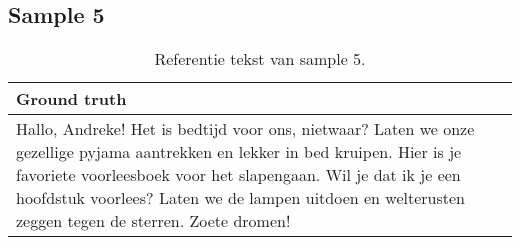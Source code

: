\subsection{Sample 5}
\begin{table}[htbp]
    \centering
    \label{tab:groundtruth_sample5}
    \begin{tabularx}{\textwidth}{|X|}
        \hline
        \textbf{Ground truth} \\
        \hline
        Hallo, Andreke! Het is bedtijd voor ons, nietwaar? Laten we onze gezellige pyjama aantrekken en lekker in bed kruipen. Hier is je favoriete voorleesboek voor het slapengaan. Wil je dat ik je een hoofdstuk voorlees? Laten we de lampen uitdoen en welterusten zeggen tegen de sterren. Zoete dromen! \\
        \hline
    \end{tabularx}
        \caption{Referentie tekst van sample 5.}
\end{table}


